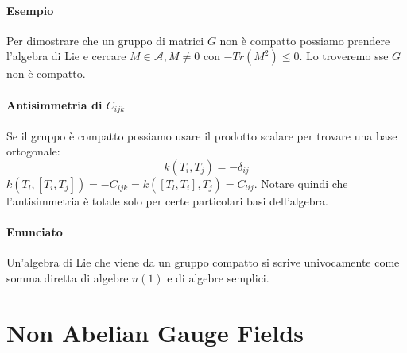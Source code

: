 \documentclass[12pt,oneside,notitlepage,abstracton,a4paper]{scrartcl}
\newcommand{\A}{\mathcal{A}}
\begin{document}
\paragraph{Esempio} Per dimostrare che un gruppo di matrici $G$ non è compatto possiamo prendere l'algebra di Lie e cercare $M\in\A,M\neq 0$ con $-Tr(M^2)\le0$. Lo troveremo sse $G$ non è compatto.

\paragraph{Antisimmetria di $C_{ijk}$} Se il gruppo è compatto possiamo usare il prodotto scalare per trovare una base ortogonale:
\[ k(T_i,T_j) = -\delta_{ij} \]
$k(T_l, [T_i, T_j]) = -C_{ijk} = k([T_l, T_i], T_j) = C_{lij}$. Notare quindi che l'antisimmetria è totale solo per certe particolari basi dell'algebra.

\paragraph{Enunciato} Un'algebra di Lie che viene da un gruppo compatto si scrive univocamente come somma diretta di algebre $u(1)$ e di algebre semplici.

\section{Non Abelian Gauge Fields}
\end{document}
